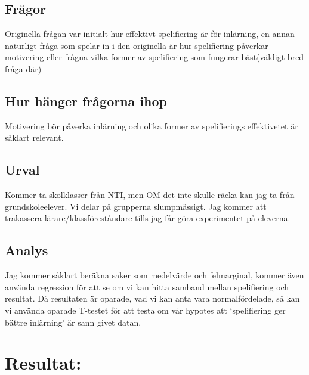 \documentclass[11p]{article}
\begin{document}
\subsection{Frågor} Originella frågan var initialt hur effektivt spelifiering är för inlärning, en annan naturligt fråga som spelar in i den originella är hur spelifiering påverkar motivering eller frågna vilka former av spelifiering som fungerar bäst(väldigt bred fråga där)

\subsection{Hur hänger frågorna ihop} Motivering bör påverka inlärning och olika former av spelifierings effektivetet är såklart relevant.

\subsection{Urval} Kommer ta skolklasser från NTI, men OM det inte skulle räcka kan jag ta från grundskoleelever. Vi delar på grupperna slumpmässigt. Jag kommer att trakassera lärare/klassföreståndare tills jag får göra experimentet på eleverna.

\subsection{Analys} Jag kommer såklart beräkna saker som medelvärde och felmarginal, kommer även använda regression för att se om vi kan hitta samband mellan spelifiering och resultat. Då resultaten är oparade, vad vi kan anta vara normalfördelade, så kan vi använda oparade T-testet för att testa om vår hypotes att ‘spelifiering ger bättre inlärning’ är sann givet datan.

\section{Resultat:}
\end{document}
